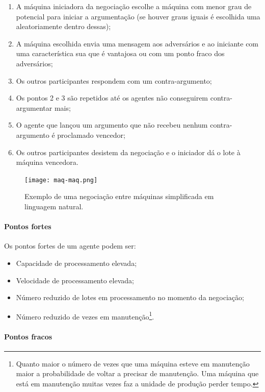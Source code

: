 \begin{titlepage}
\begin{enumerate}
\item A máquina iniciadora da negociação escolhe a máquina com menor grau de potencial para iniciar a argumentação (se houver graus iguais é escolhida uma aleatoriamente dentro dessas);
\item A máquina escolhida envia uma mensagem aos adversários e ao iniciante com uma característica sua que é vantajosa ou com um ponto fraco dos adversários;
\item Os outros participantes respondem com um contra-argumento;
\item Os pontos 2 e 3 são repetidos até os agentes não conseguirem contra-argumentar mais;
\item O agente que lançou um argumento que não recebeu nenhum contra-argumento é proclamado vencedor;
\item Os outros participantes desistem da negociação e o iniciador dá o lote à máquina vencedora.
\end{enumerate}

\begin{figure}[H]
  \centering
    \texttt{[image: maq-maq.png]}
  \caption{Exemplo de uma negociação entre máquinas simplificada em linguagem natural.}
  \label{maq-maqScheme}
\end{figure}

\paragraph{Pontos fortes}

Os pontos fortes de um agente podem ser:

\begin{itemize}
\item Capacidade de processamento elevada;
\item Velocidade de processamento elevada;
\item Número reduzido de lotes em processamento no momento da negociação;
\item Número reduzido de vezes em manutenção\footnote{Quanto maior o número de vezes que uma máquina esteve em manutenção maior a probabilidade de voltar a precisar de manutenção. Uma máquina que está em manutenção muitas vezes faz a unidade de produção perder tempo.}.
\end{itemize}

\paragraph{Pontos fracos}


\end{titlepage}

